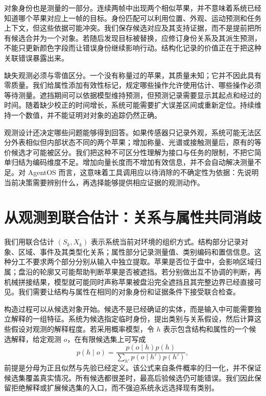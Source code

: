 对象身份也是测量的一部分。连续两帧中出现两个相似苹果，并不意味着系统已经知道哪个苹果对应上一帧的目标。身份匹配可以利用位置、外观、运动预测和任务上下文，但这些依据可能冲突。我们保存候选对应及其支持证据，而不是提前把所有候选合并为一个对象。若随后发现目标被替换，应修订身份关系及其派生预测，不能只更新颜色字段而让错误身份继续影响行动。结构化记录的价值正在于把这种关联错误暴露出来。

缺失观测必须与零值区分。一个没有称量过的苹果，其质量未知；它并不因此具有零质量。我们给属性添加有效性标记，规定哪些操作允许使用估计、哪些操作必须等待测量。遮挡期间可以依据模型维持预测，但预测记录需要显示其起点和经过的时间。随着缺少校正的时间增长，系统可能需要扩大误差区间或重新定位。持续维持一个数值，并不能证明对对象的追踪仍然正确。

观测设计还决定哪些问题能够得到回答。如果传感器只记录外观，系统可能无法区分外表相似但内部状态不同的两个苹果；增加称量、光谱或接触测量后，原有的等价候选才可能被区分。我们把这种不可区分性理解为接口与任务的限制，不把它简单归结为编码维度不足。增加向量长度而不增加有效信息，并不会自动解决测量不足。对 AgentOS 而言，这意味着工具调用应以待消除的不确定性为依据：先说明当前决策需要辨别什么，再选择能够提供相应证据的观测动作。

\section{从观测到联合估计：关系与属性共同消歧}
\label{sec:quantum_field}

我们用联合估计 $(S_k,X_k)$ 表示系统当前对环境的组织方式。结构部分记录对象、区域、事件及其类型化关系；属性部分记录测量值、类别编码和置信信息。这种分工不要求两个部分分别从输入中独立提取。苹果是否位于盘中，会影响区域归属；盘沿的轮廓又可能帮助判断苹果是否被遮挡。若分别做出互不协调的判断，再机械拼接结果，模型就可能同时声称苹果被盘沿完全遮挡且其完整边界已经直接可见。我们需要让结构与属性在相同的对象身份和证据条件下接受联合检查。

构造过程可以从候选对象开始。候选不是已经确证的实体，而是输入中可能需要独立解释的一组特征。系统为候选指定临时身份，提出类别与关系假设，然后计算这些假设对观测的解释程度。若采用概率模型，令 $h$ 表示包含结构和属性的一个候选解释，给定观测 $o$，在有限候选集上可写成
\begin{equation}
p(h\mid o)=\frac{p(o\mid h)p(h)}{\sum_{h'}p(o\mid h')p(h')},
\end{equation}
前提是分母为正且似然与先验已经定义。该公式来自条件概率的归一化，并不保证候选集覆盖真实情况。所有候选都很差时，最高后验候选仍可能错误。我们因此保留拒绝解释或扩展候选集的入口，而不强迫系统永远选择现有类别。

